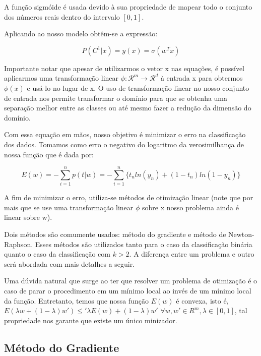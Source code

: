 A função sigmóide é usada devido à sua propriedade de mapear
todo o conjunto dos números reais dentro do intervalo $[0, 1]$.

Aplicando ao nosso modelo obtêm-se a expressão:

\begin{center}
	\begin{equation}
		P(C^1 | x) = y(x) = \sigma(w^Tx)
	\end{equation}
\end{center}

Importante notar que apesar de utilizarmos o vetor x nas equações, é possível aplicarmos uma
transformação linear $\phi : \mathcal{R}^m \rightarrow \mathcal{R}^d$ à entrada x para obtermos
$\phi(x)$ e usá-lo no lugar de x. O uso de transformação linear no nosso conjunto
de entrada nos permite transformar o domínio para que se obtenha uma separação
melhor entre as classes ou até mesmo fazer a redução da dimensão do domínio.

Com essa equação em mãos, nosso objetivo é minimizar o erro na classificação dos dados. Tomamos
como erro o negativo do logaritmo da verosimilhança de nossa função que é dada por:

\begin{center}
	\begin{equation}
		E(w) = - \sum_{i = 1}^{n} p(t | w) = 
		- \sum_{i = 1}^{n} \{ t_nln(y_n) + (1 - t_n) ln(1 - y_n) \}
	\end{equation}
\end{center}

A fim de minimizar o erro, utiliza-se métodos de otimização linear (note que por mais que se use uma
transformação linear $\phi$ sobre x nosso problema ainda é linear sobre w).

Dois métodos são comumente	usados: método do gradiente e método de Newton-Raphson.
Esses métodos são utilizados tanto para o caso da classificação binária
quanto o caso da classificação com $k > 2$. A diferença entre um problema e outro será abordada
com mais detalhes a seguir.

Uma dúvida natural que surge ao ter que resolver um problema de otimização é o caso de parar o
procedimento em um mínimo local ao invés de um mínimo local da função.	Entretanto, temos que nossa
função $E(w)$ é convexa, isto é, $E(\lambda w + (1 - \lambda ) w') \leq' \lambda E(w) 
	+ (1 - \lambda ) w'$
 $\forall w, w' \in R^m, \lambda \in [0, 1]$, tal propriedade nos garante que existe um único minizador.
 

\subsection{Método do Gradiente}\label{subsec:grad_descent}

